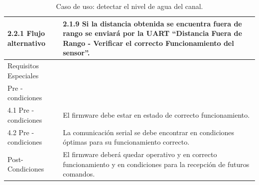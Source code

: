 \begin{table}[t]
\begin{center}
\begin{tabular}{ | m{4cm} | m{9cm} | }
2.2.1 Flujo alternativo  & 
2.1.9 Si la distancia obtenida se encuentra fuera de rango se enviará por la UART “Distancia Fuera de Rango - Verificar el correcto Funcionamiento del  sensor”. \\ \hline

Requisitos Especiales & \\ \hline


Pre - condiciones & \\ \hline
 
4.1 Pre - condiciones & 
El firmware debe estar en estado de correcto funcionamiento. \\ \hline

4.2 Pre - condiciones &
La comunicación serial se debe encontrar en condiciones óptimas para su funcionamiento correcto. \\ \hline

Post- Condiciones &
El firmware deberá quedar operativo y en correcto 
funcionamiento y en condiciones para la recepción de futuros comandos. \\ \hline

\end{tabular}
\caption{ Caso de uso: detectar el nivel de agua del canal.}
\label{tab:coches}
\end{center}
\end{table}

%
%
%
%
%
%	
%		
%
%		
%		
%		
%		
%
%
%
